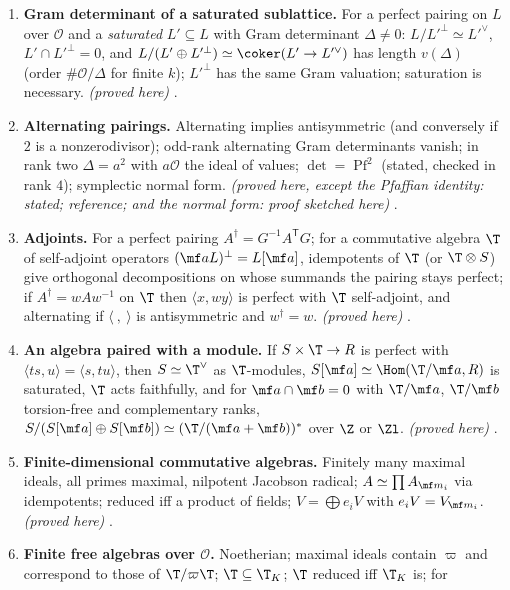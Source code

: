 \begin{enumerate}[label=\textbf{\thechapter.\arabic*}]
\item \textbf{Gram determinant of a saturated sublattice.} For a perfect pairing on $L$ over $\mathcal O$ and a \emph{saturated} $L'\subseteq L$ with Gram determinant $\Delta\ne0$:
$L/L'^\perp\simeq L'^\vee$, $L'\cap L'^\perp=0$, and $L/(L'\oplus L'^\perp)\simeq\coker(L'\to L'^\vee)$ has length $v(\Delta)$ (order $\#\mathcal O/\Delta$ for finite $k$); $L'^\perp$ has the same
Gram valuation; saturation is necessary. \emph{(proved here)} .
\item \textbf{Alternating pairings.} Alternating implies antisymmetric (and conversely if $2$ is a nonzerodivisor); odd-rank alternating Gram determinants vanish; in
rank two $\Delta=a^2$ with $a\mathcal O$ the ideal of values; $\det=\operatorname{Pf}^2$ (stated, checked in rank $4$); symplectic normal form. \emph{(proved here, except the Pfaffian
identity: stated; reference; and the normal form: proof sketched here)} .
\item \textbf{Adjoints.} For a perfect pairing $A^\dagger=G^{-1}A^{\mathsf T}G$; for a commutative algebra $\T$ of self-adjoint operators $(\mf aL)^\perp=L[\mf a]$, idempotents of $\T$ (or
$\T\otimes S$) give orthogonal decompositions on whose summands the pairing stays perfect; if $A^\dagger=wAw^{-1}$ on $\T$ then $\langle x,wy\rangle$ is perfect with $\T$ self-adjoint,
and alternating if $\langle\ ,\ \rangle$ is antisymmetric and $w^\dagger=w$. \emph{(proved here)} .
\item \textbf{An algebra paired with a module.} If $S\times\T\to R$ is perfect with $\langle ts,u\rangle=\langle s,tu\rangle$, then $S\simeq\T^\vee$ as $\T$-modules, $S[\mf a]\simeq\Hom(\T/\mf a,R)$
is saturated, $\T$ acts faithfully, and for $\mf a\cap\mf b=0$ with $\T/\mf a$, $\T/\mf b$ torsion-free and complementary ranks, $S/(S[\mf a]\oplus S[\mf b])\simeq(\T/(\mf a+\mf b))^*$ over $\Z$ or $\Zl$.
\emph{(proved here)} .
\item \textbf{Finite-dimensional commutative algebras.} Finitely many maximal ideals, all primes maximal, nilpotent Jacobson radical; $A\simeq\prod A_{\mf m_i}$ via idempotents;
reduced iff a product of fields; $V=\bigoplus e_iV$ with $e_iV=V_{\mf m_i}$. \emph{(proved here)} .
\item \textbf{Finite free algebras over $\mathcal O$.} Noetherian; maximal ideals contain $\varpi$ and correspond to those of $\T/\varpi\T$; $\T\subseteq\T_K$; $\T$ reduced iff $\T_K$ is; for

\end{enumerate}
